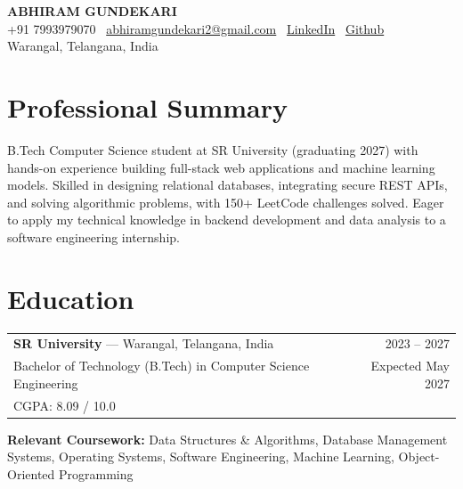\documentclass[10pt, a4paper]{article}
\begin{document}
\pagestyle{empty}

\begin{center}
  {\LARGE \textbf{ABHIRAM GUNDEKARI}} \\[4pt]
  +91 7993979070 \textbar\
  \href{mailto:abhiramgundekari2@gmail.com}{abhiramgundekari2@gmail.com} \textbar\
  \href{https://www.linkedin.com/in/abhiram-gundekari-56a740295/}{LinkedIn} \textbar\
  \href{https://github.com/2303A51087}{Github} \\[2pt]
  Warangal, Telangana, India
\end{center}

\vspace{2pt}

\section*{Professional Summary}
\vspace{1pt}
B.Tech Computer Science student at SR University (graduating 2027) with hands-on experience building full-stack web applications and machine learning models. Skilled in designing relational databases, integrating secure REST APIs, and solving algorithmic problems, with 150+ LeetCode challenges solved. Eager to apply my technical knowledge in backend development and data analysis to a software engineering internship.

\section*{Education}
\vspace{1pt}
\begin{tabularx}{\textwidth}{@{}X r@{}}
  \textbf{SR University} — Warangal, Telangana, India & 2023 – 2027 \\
  Bachelor of Technology (B.Tech) in Computer Science Engineering & Expected May 2027 \\
  CGPA: 8.09 / 10.0 & \\
\end{tabularx}

\vspace{2pt}
\textbf{Relevant Coursework:} Data Structures \& Algorithms, Database Management Systems,
Operating Systems, Software Engineering, Machine Learning, Object-Oriented Programming

\end{document}
